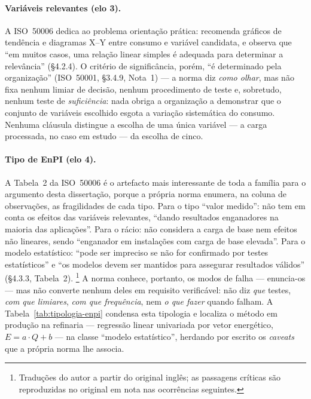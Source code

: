 \paragraph{Variáveis relevantes (elo 3).} A ISO~50006 dedica ao problema orientação prática: recomenda gráficos de tendência e diagramas X--Y entre consumo e variável candidata, e observa que \enquote{em muitos casos, uma relação linear simples é adequada para determinar a relevância} (\S4.2.4). O critério de significância, porém, \enquote{é determinado pela organização} (ISO~50001, \S3.4.9, Nota~1) --- a norma diz \emph{como olhar}, mas não fixa nenhum limiar de decisão, nenhum procedimento de teste e, sobretudo, nenhum teste de \emph{suficiência}: nada obriga a organização a demonstrar que o conjunto de variáveis escolhido esgota a variação sistemática do consumo. Nenhuma cláusula distingue a escolha de uma única variável --- a carga processada, no caso em estudo --- da escolha de cinco.

\paragraph{Tipo de EnPI (elo 4).} A Tabela~2 da ISO~50006 é o artefacto mais interessante de toda a família para o argumento desta dissertação, porque a própria norma enumera, na coluna de observações, as fragilidades de cada tipo. Para o tipo \enquote{valor medido}: não tem em conta os efeitos das variáveis relevantes, \enquote{dando resultados enganadores na maioria das aplicações}. Para o rácio: não considera a carga de base nem efeitos não lineares, sendo \enquote{enganador em instalações com carga de base elevada}. Para o modelo estatístico: \enquote{pode ser impreciso se não for confirmado por testes estatísticos} e \enquote{os modelos devem ser mantidos para assegurar resultados válidos} (\S4.3.3, Tabela~2). \footnote{Traduções do autor a partir do original inglês; as passagens críticas são reproduzidas no original em nota nas ocorrências seguintes.} A norma conhece, portanto, os modos de falha --- enuncia-os --- mas não converte nenhum deles em requisito verificável: não diz \emph{que} testes, \emph{com que limiares}, \emph{com que frequência}, nem \emph{o que fazer} quando falham. A Tabela~\ref{tab:tipologia-enpi} condensa esta tipologia e localiza o método em produção na refinaria --- regressão linear univariada por vetor energético, $E = a \cdot Q + b$ --- na classe \enquote{modelo estatístico}, herdando por escrito os \emph{caveats} que a própria norma lhe associa.

